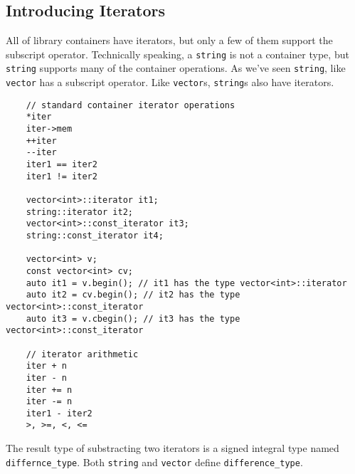 \documentclass[11pt]{ctexart}
\begin{document}
\subsection{Introducing Iterators}
All of library containers have iterators, but only a few of them support the subscript operator. Technically speaking, a \verb|string| is not a container type, but \verb|string| supports many of the container operations. As we've seen \verb|string|, like \verb|vector| has a subscript operator. Like \verb|vector|s, \verb|string|s also have iterators.
\begin{lstlisting}
    // standard container iterator operations
    *iter
    iter->mem
    ++iter
    --iter
    iter1 == iter2
    iter1 != iter2

    vector<int>::iterator it1;
    string::iterator it2;
    vector<int>::const_iterator it3;
    string::const_iterator it4;

    vector<int> v;
    const vector<int> cv;
    auto it1 = v.begin(); // it1 has the type vector<int>::iterator
    auto it2 = cv.begin(); // it2 has the type vector<int>::const_iterator
    auto it3 = v.cbegin(); // it3 has the type vector<int>::const_iterator

    // iterator arithmetic
    iter + n
    iter - n
    iter += n
    iter -= n
    iter1 - iter2
    >, >=, <, <=
\end{lstlisting}
The result type of substracting two iterators is a signed integral type named \verb|differnce_type|. Both \verb|string| and \verb|vector| define \verb|difference_type|.
\end{document}
